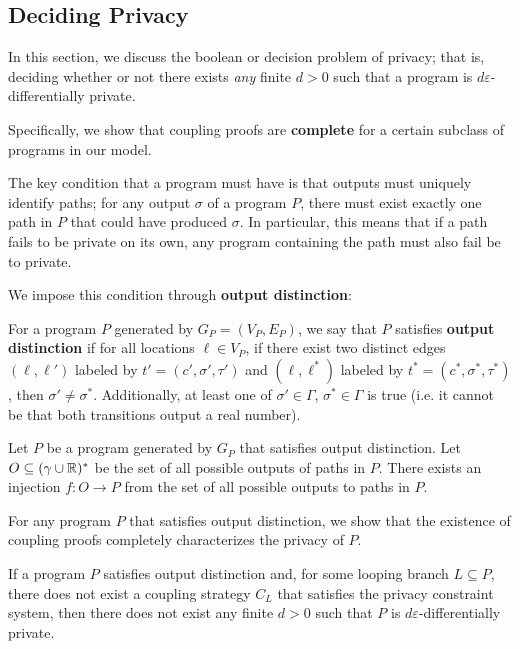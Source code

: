 \subsection{Deciding Privacy}

In this section, we discuss the boolean or decision problem of privacy; that is, deciding whether or not there exists \textit{any} finite $d>0$ such that a program is $d\varepsilon$-differentially private.

Specifically, we show that coupling proofs are \textbf{complete} for a certain subclass of programs in our model.

The key condition that a program must have is that outputs must uniquely identify paths; for any output $\sigma$ of a program $P$, there must exist exactly one path in $P$ that could have produced $\sigma$. In particular, this means that if a path fails to be private on its own, any program containing the path must also fail be to private. 

We impose this condition through \textbf{output distinction}:

\begin{defn}\label{outputDistinctionDef}
    For a program $P$ generated by $G_P = (V_P, E_P)$, we say that $P$ satisfies \textbf{output distinction} if for all locations $\ell\in V_P$, if there exist two distinct edges $(\ell, \ell')$ labeled by $t'=(c', \sigma', \tau')$ and $(\ell, \ell^*)$ labeled by $t^* = (c^*, \sigma^*, \tau^*)$, then $\sigma' \neq \sigma^*$. Additionally, at least one of $\sigma'\in \Gamma$, $\sigma^*\in \Gamma$ is true (i.e. it cannot be that both transitions output a real number).
\end{defn}

\begin{prop}
    Let $P$ be a program generated by $G_P$ that satisfies output distinction. Let $O\subseteq (\gamma\cup \mathbb{R})^*$ be the set of all possible outputs of paths in $P$. There exists an injection $f: O\to P$ from the set of all possible outputs to paths in $P$. 
\end{prop}

For any program $P$ that satisfies output distinction, we show that the existence of coupling proofs completely characterizes the privacy of $P$.

\begin{thm}\label{ProgramCounterexampleThm}
    If a program $P$ satisfies output distinction and, for some looping branch $L\subseteq P$, there does not exist a coupling strategy $C_L$ that satisfies the privacy constraint system, then there does not exist any finite $d>0$ such that $P$ is $d\varepsilon$-differentially private.
\end{thm}

